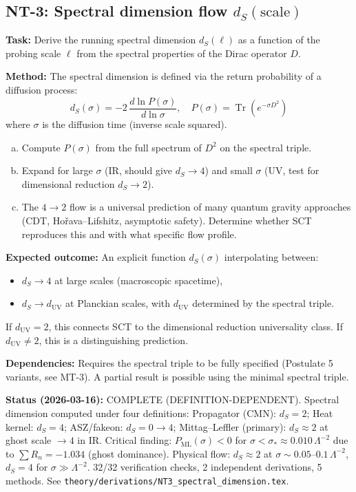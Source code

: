 \documentclass[12pt,a4paper]{article}
\newcommand{\Tr}{\operatorname{Tr}}
\newcommand{\task}[1]{\noindent\textbf{Task:} #1\par}
\newcommand{\method}[1]{\noindent\textbf{Method:} #1\par}
\newcommand{\outcome}[1]{\noindent\textbf{Expected outcome:} #1\par}
\newcommand{\deps}[1]{\noindent\textbf{Dependencies:} #1\par}
\begin{document}
\subsection{NT-3: Spectral dimension flow $d_S(\text{scale})$}
\label{task:NT3}

\task{Derive the running spectral dimension $d_S(\ell)$ as a function of
the probing scale $\ell$ from the spectral properties of the Dirac operator $D$.}

\method{
The spectral dimension is defined via the return probability of a diffusion process:
\begin{equation}\label{eq:spectral-dim}
  d_S(\sigma) = -2\,\frac{d \ln P(\sigma)}{d \ln \sigma}, \quad
  P(\sigma) = \Tr\!\left(e^{-\sigma D^2}\right)
\end{equation}
where $\sigma$ is the diffusion time (inverse scale squared).
\begin{enumerate}[(a)]
  \item Compute $P(\sigma)$ from the full spectrum of $D^2$ on the spectral triple.
  \item Expand for large $\sigma$ (IR, should give $d_S \to 4$) and small $\sigma$
    (UV, test for dimensional reduction $d_S \to 2$).
  \item The $4 \to 2$ flow is a universal prediction of many quantum gravity approaches
    (CDT, Ho\v{r}ava--Lifshitz, asymptotic safety). Determine whether SCT reproduces
    this and with what specific flow profile.
\end{enumerate}
}

\outcome{An explicit function $d_S(\sigma)$ interpolating between:
\begin{itemize}
  \item $d_S \to 4$ at large scales (macroscopic spacetime),
  \item $d_S \to d_{\text{UV}}$ at Planckian scales, with $d_{\text{UV}}$
    determined by the spectral triple.
\end{itemize}
If $d_{\text{UV}} = 2$, this connects SCT to the dimensional reduction universality
class. If $d_{\text{UV}} \neq 2$, this is a distinguishing prediction.
}

\deps{Requires the spectral triple to be fully specified (Postulate 5 variants,
see MT-3). A partial result is possible using the minimal spectral triple.}

\textbf{Status (2026-03-16):} \textcolor{proven}{COMPLETE (DEFINITION-DEPENDENT).}
Spectral dimension computed under four definitions:
Propagator (CMN): $d_S = 2$; Heat kernel: $d_S = 4$;
ASZ/fakeon: $d_S = 0 \to 4$; Mittag--Leffler (primary): $d_S \approx 2$ at
ghost scale $\to 4$ in IR.
Critical finding: $P_{\mathrm{ML}}(\sigma) < 0$ for
$\sigma < \sigma_* \approx 0.010\,\Lambda^{-2}$ due to
$\sum R_n = -1.034$ (ghost dominance).
Physical flow: $d_S \approx 2$ at $\sigma \sim 0.05$--$0.1\,\Lambda^{-2}$,
$d_S = 4$ for $\sigma \gg \Lambda^{-2}$.
32/32 verification checks, 2 independent derivations, 5 methods.
See \texttt{theory/derivations/NT3\_spectral\_dimension.tex}.
\end{document}
